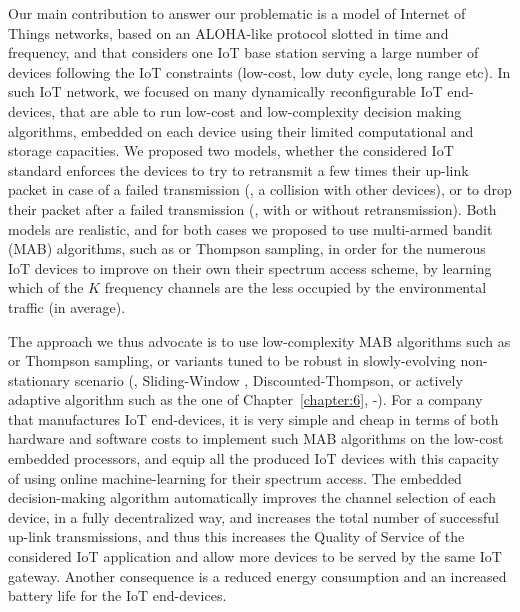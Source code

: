 Our main contribution to answer our problematic is a model of Internet of Things networks, based on an ALOHA-like protocol slotted in time and frequency, and that considers one IoT base station serving a large number of devices following the IoT constraints (low-cost, low duty cycle, long range etc).
In such IoT network, we focused on many dynamically reconfigurable IoT end-devices, that are able to run low-cost and low-complexity decision making algorithms, embedded on each device using their limited computational and storage capacities.
We proposed two models, whether the considered IoT standard enforces the devices to try to retransmit a few times their up-link packet in case of a failed transmission (\ie, a collision with other devices),
or to drop their packet after a failed transmission (\ie, with or without retransmission).
Both models are realistic, and for both cases we proposed to use multi-armed bandit (MAB) algorithms, such as \UCB{} or Thompson sampling, in order for the numerous IoT devices to improve on their own their spectrum access scheme, by learning which of the $K$ frequency channels are the less occupied by the environmental traffic (in average).

The approach we thus advocate is to use low-complexity MAB algorithms such as \klUCB{} or Thompson sampling, or variants tuned to be robust in slowly-evolving non-stationary scenario (\eg, Sliding-Window \UCB, Discounted-Thompson, or actively adaptive algorithm such as the one of Chapter~\ref{chapter:6}, \GLR-\klUCB).
%
For a company that manufactures IoT end-devices, it is very simple and cheap in terms of both hardware and software costs to implement such MAB algorithms on the low-cost embedded processors, and equip all the produced IoT devices with this capacity of using online machine-learning for their spectrum access.
The embedded decision-making algorithm automatically improves the channel selection of each device, in a fully decentralized way, and increases the total number of successful up-link transmissions, and thus this increases the Quality of Service of the considered IoT application and allow more devices to be served by the same IoT gateway.
%
Another consequence is a reduced energy consumption and an increased battery life for the IoT end-devices.

